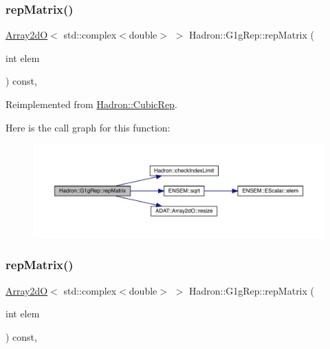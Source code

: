 \subsubsection{\texorpdfstring{repMatrix()}{repMatrix()}\hspace{0.1cm}{\footnotesize\ttfamily [2/3]}}
{\footnotesize\ttfamily \mbox{\hyperlink{classADAT_1_1Array2dO}{Array2dO}}$<$ std\+::complex$<$double$>$ $>$ Hadron\+::\+G1g\+Rep\+::rep\+Matrix (\begin{DoxyParamCaption}\item[{int}]{elem }\end{DoxyParamCaption}) const\hspace{0.3cm}{\ttfamily [inline]}, {\ttfamily [virtual]}}



Reimplemented from \mbox{\hyperlink{structHadron_1_1CubicRep_ac5d7e9e6f4ab1158b5fce3e4ad9e8005}{Hadron\+::\+Cubic\+Rep}}.

Here is the call graph for this function\+:
\nopagebreak
\begin{figure}[H]
\begin{center}
\leavevmode
\includegraphics[width=350pt]{d4/d3c/structHadron_1_1G1gRep_a0671004832091015635bb8565653340c_cgraph}
\end{center}
\end{figure}
\mbox{\label{structHadron_1_1G1gRep_a0671004832091015635bb8565653340c}} 
\subsubsection{\texorpdfstring{repMatrix()}{repMatrix()}\hspace{0.1cm}{\footnotesize\ttfamily [3/3]}}
{\footnotesize\ttfamily \mbox{\hyperlink{classADAT_1_1Array2dO}{Array2dO}}$<$ std\+::complex$<$double$>$ $>$ Hadron\+::\+G1g\+Rep\+::rep\+Matrix (\begin{DoxyParamCaption}\item[{int}]{elem }\end{DoxyParamCaption}) const\hspace{0.3cm}{\ttfamily [inline]}, {\ttfamily [virtual]}}



